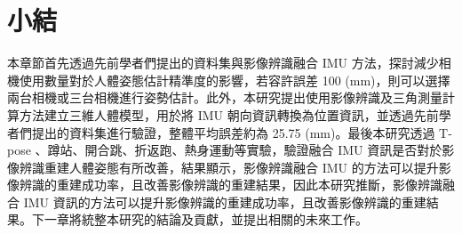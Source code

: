 
\section{小結}
本章節首先透過先前學者們提出的資料集與影像辨識融合 IMU 方法，探討減少相機使用數量對於人體姿態估計精準度的影響，若容許誤差 100 (mm)，則可以選擇兩台相機或三台相機進行姿勢估計。此外，本研究提出使用影像辨識及三角測量計算方法建立三維人體模型，用於將 IMU 朝向資訊轉換為位置資訊，並透過先前學者們提出的資料集進行驗證，整體平均誤差約為 25.75 (mm)。最後本研究透過 T-pose 、蹲站、開合跳、折返跑、熱身運動等實驗，驗證融合 IMU 資訊是否對於影像辨識重建人體姿態有所改善，結果顯示，影像辨識融合 IMU 的方法可以提升影像辨識的重建成功率，且改善影像辨識的重建結果，因此本研究推斷，影像辨識融合 IMU 資訊的方法可以提升影像辨識的重建成功率，且改善影像辨識的重建結果。下一章將統整本研究的結論及貢獻，並提出相關的未來工作。

\clearpage